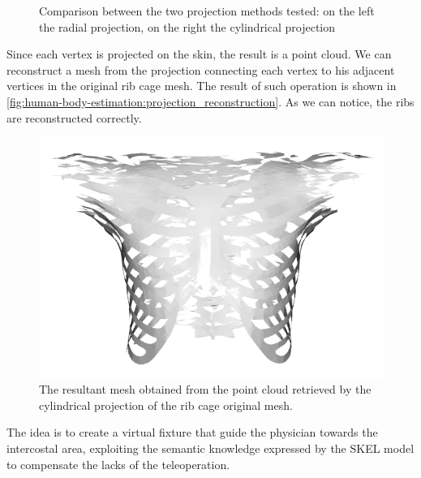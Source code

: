 \begin{figure}[H]
\begin{subfigure}[b]{0.3\textwidth}
         \caption{}
         \label{}
     \end{subfigure}
\caption{Comparison between the two projection methods tested: on the left the radial projection, on the right the cylindrical projection}
\label{fig:human-body-estimation:skeleton-projection}
\end{figure}

Since each vertex is projected on the skin, the result is a point cloud. We can reconstruct a mesh from the projection connecting each vertex to his adjacent vertices in the original rib cage mesh.
The result of such operation is shown in \autoref{fig:human-body-estimation:projection_reconstruction}. As we can notice, the ribs are reconstructed correctly.
\begin{figure}[H]
    \centering   \includegraphics[width=0.7\linewidth]{images/body_estimation/rib_cage_proj.png}
    \caption{The resultant mesh obtained from the point cloud retrieved by the cylindrical projection of the rib cage original mesh.}
    \label{fig:human-body-estimation:projection_reconstruction}
\end{figure}
The idea is to create a virtual fixture that guide the physician towards the intercostal area, exploiting the semantic knowledge expressed by the SKEL model to compensate the lacks of the teleoperation.